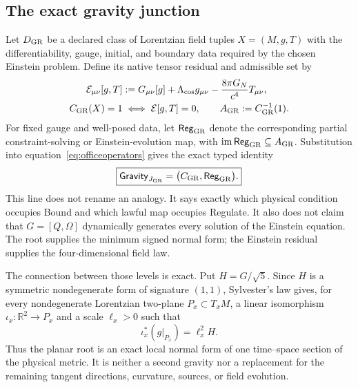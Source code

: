 \documentclass[10pt]{article}
\newcommand{\R}{\mathbb R}
\begin{document}
\subsection*{The exact gravity junction}
Let $D_{\rm GR}$ be a declared class of Lorentzian field tuples
$X=(M,g,T)$ with the differentiability, gauge, initial, and boundary data
required by the chosen Einstein problem. Define its native tensor residual
and admissible set by
\begin{equation}
\begin{aligned}
\mathcal E_{\mu\nu}[g,T]
&:=G_{\mu\nu}[g]+\Lambda_{\rm cos}g_{\mu\nu}
-\frac{8\pi G_N}{c^4}T_{\mu\nu},\\
C_{\rm GR}(X)=1
&\iff \mathcal E[g,T]=0,
\qquad A_{\rm GR}:=C_{\rm GR}^{-1}(1).
\end{aligned}
\label{eq:einsteinresidual}
\end{equation}
For fixed gauge and well-posed data, let $\mathsf{Reg}_{\rm GR}$ denote the
corresponding partial constraint-solving or Einstein-evolution map, with
$\operatorname{im}\mathsf{Reg}_{\rm GR}\subseteq A_{\rm GR}$. Substitution
into equation~\eqref{eq:officeoperators} gives the exact typed identity
\begin{equation}
\boxed{\mathsf{Gravity}_{J_{\rm GR}}
=\bigl(C_{\rm GR},\mathsf{Reg}_{\rm GR}\bigr).}
\label{eq:gravityinstance}
\end{equation}
This line does not rename an analogy. It says exactly which physical
condition occupies Bound and which lawful map occupies Regulate. It also
does not claim that $G=[Q,\Omega]$ dynamically generates every solution of the
Einstein equation. The root supplies the minimum signed normal form; the
Einstein residual supplies the four-dimensional field law.

The connection between those levels is exact. Put $H=G/\sqrt5$. Since $H$
is a symmetric nondegenerate form of signature $(1,1)$, Sylvester's law gives,
for every nondegenerate Lorentzian two-plane $P_x\subset T_xM$, a linear
isomorphism $\iota_x:\R^2\to P_x$ and a scale $\ell_x>0$ such that
\begin{equation}
\boxed{\iota_x^*(g|_{P_x})=\ell_x^2H.}
\label{eq:lorentziannormalform}
\end{equation}
Thus the planar root is an exact local normal form of one time--space section
of the physical metric. It is neither a second gravity nor a replacement for
the remaining tangent directions, curvature, sources, or field evolution.
\end{document}
